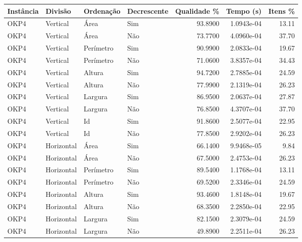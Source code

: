 \begin{tabular}{llllrrr}
    \hline
    Instância & Divisão     & Ordenação & Decrescente & Qualidade \% & Tempo (s)  & Itens \% \\
    \hline
    OKP4      & Vertical    & Área      & Sim         & 93.8900      & 1.0943e-04 & 13.11    \\
    OKP4      & Vertical    & Área      & Não         & 73.7700      & 4.0960e-04 & 37.70    \\
    OKP4      & Vertical    & Perímetro & Sim         & 90.9900      & 2.0833e-04 & 19.67    \\
    OKP4      & Vertical    & Perímetro & Não         & 71.0600      & 3.8357e-04 & 34.43    \\
    OKP4      & Vertical    & Altura    & Sim         & 94.7200      & 2.7885e-04 & 24.59    \\
    OKP4      & Vertical    & Altura    & Não         & 77.9900      & 2.1319e-04 & 26.23    \\
    OKP4      & Vertical    & Largura   & Sim         & 86.9500      & 2.0637e-04 & 27.87    \\
    OKP4      & Vertical    & Largura   & Não         & 76.8500      & 4.3707e-04 & 37.70    \\
    OKP4      & Vertical    & Id        & Sim         & 91.8600      & 2.5077e-04 & 22.95    \\
    OKP4      & Vertical    & Id        & Não         & 77.8500      & 2.9202e-04 & 26.23    \\
    OKP4      & Horizontal  & Área      & Sim         & 66.1400      & 9.9468e-05 & 9.84     \\
    OKP4      & Horizontal  & Área      & Não         & 67.5000      & 2.4753e-04 & 26.23    \\
    OKP4      & Horizontal  & Perímetro & Sim         & 89.5400      & 1.1768e-04 & 13.11    \\
    OKP4      & Horizontal  & Perímetro & Não         & 69.5200      & 2.3346e-04 & 24.59    \\
    OKP4      & Horizontal  & Altura    & Sim         & 93.4600      & 1.8148e-04 & 19.67    \\
    OKP4      & Horizontal  & Altura    & Não         & 68.3500      & 2.2850e-04 & 22.95    \\
    OKP4      & Horizontal  & Largura   & Sim         & 82.1500      & 2.3079e-04 & 24.59    \\
    OKP4      & Horizontal  & Largura   & Não         & 49.8900      & 2.2511e-04 & 26.23    \\

\end{tabular}
